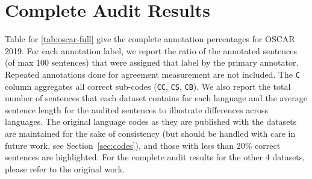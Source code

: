 \section{Complete Audit Results}\label{app:stats}
Table for \ref{tab:oscar-full} give the complete annotation percentages for OSCAR 2019. For each annotation label, we report the ratio of the annotated sentences (of max 100 sentences) that were assigned that label by the primary annotator. Repeated annotations done for agreement measurement are not included. The \texttt{C} column aggregates all correct sub-codes (\texttt{CC}, \texttt{CS}, \texttt{CB}). We also report the total number of sentences that each dataset contains for each language and the average sentence length for the audited sentences to illustrate differences across languages. The original language codes as they are published with the datasets are maintained for the sake of consistency (but should be handled with care in future work, see Section~\ref{sec:codes}), and those with less than 20\% correct sentences are highlighted. For the complete audit results for the other 4 datasets, please refer to the original \citet{kreutzer-etal-2021-quality} work.


